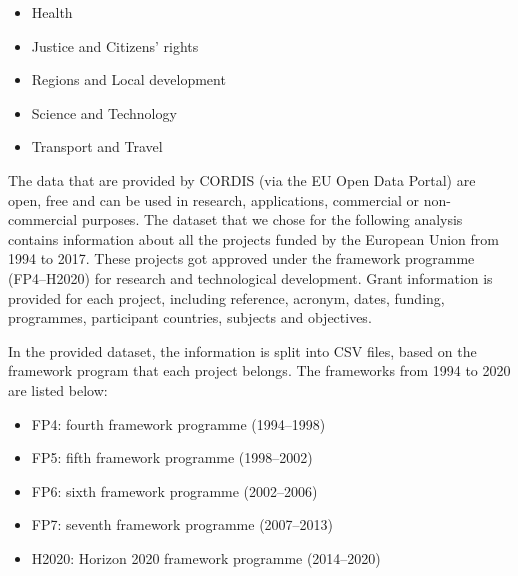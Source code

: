 \documentclass[12pt]{report}
\begin{document}
\begin{itemize}
\item Health
\item Justice and Citizens' rights
\item Regions and Local development
\item Science and Technology
\item Transport and Travel
\end{itemize}

The data that are provided by CORDIS (via the EU Open Data Portal) are
open, free and can be used in research, applications, commercial or
non-commercial purposes. The dataset that we chose for the following
analysis contains information about all the projects funded by the
European Union from 1994 to 2017. These projects got approved under
the framework programme (FP4--H2020) for research and technological
development. Grant information is provided for each project, 
including reference, acronym, dates, funding, programmes, 
participant countries, subjects and objectives.

In the provided dataset, the information is split into
CSV files, based on the framework program that each project belongs.
The frameworks from 1994 to 2020 are listed below:

\begin{itemize}
\item FP4: fourth framework programme (1994--1998)
\item FP5: fifth framework programme (1998--2002)
\item FP6: sixth framework programme (2002--2006)
\item FP7: seventh framework programme (2007--2013)
\item H2020: Horizon 2020 framework programme (2014--2020)
\end{itemize}
\end{document}

